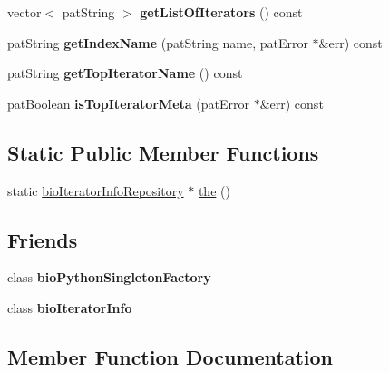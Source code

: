 \begin{DoxyCompactItemize}
vector$<$ pat\+String $>$ {\bfseries get\+List\+Of\+Iterators} () const
\item 
\mbox{\label{classbio_iterator_info_repository_a0c4ee71a20814e3e6a7fcc753958ed37}} 
pat\+String {\bfseries get\+Index\+Name} (pat\+String name, pat\+Error $\ast$\&err) const
\item 
\mbox{\label{classbio_iterator_info_repository_ab7bd544d192b06e80a9babf94e3bbd2e}} 
pat\+String {\bfseries get\+Top\+Iterator\+Name} () const
\item 
\mbox{\label{classbio_iterator_info_repository_af59f350610349ae86735f69ce36798e8}} 
pat\+Boolean {\bfseries is\+Top\+Iterator\+Meta} (pat\+Error $\ast$\&err) const
\end{DoxyCompactItemize}
\subsection*{Static Public Member Functions}
\begin{DoxyCompactItemize}
\item 
static \hyperlink{classbio_iterator_info_repository}{bio\+Iterator\+Info\+Repository} $\ast$ \hyperlink{classbio_iterator_info_repository_ac2b50c8da5d49a6553f9bbb166548bab}{the} ()
\end{DoxyCompactItemize}
\subsection*{Friends}
\begin{DoxyCompactItemize}
\item 
\mbox{\label{classbio_iterator_info_repository_a7112c3c569ac638826c63fda15012746}} 
class {\bfseries bio\+Python\+Singleton\+Factory}
\item 
\mbox{\label{classbio_iterator_info_repository_a5e395cc9c2432c419a834708ae358507}} 
class {\bfseries bio\+Iterator\+Info}
\end{DoxyCompactItemize}


\subsection{Member Function Documentation}
\mbox{\label{classbio_iterator_info_repository_ac2b50c8da5d49a6553f9bbb166548bab}} 
